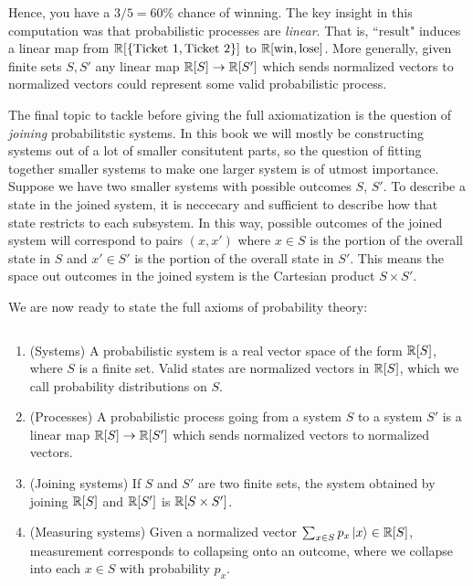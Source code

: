 Hence, you have a $3/5=60\%$ chance of winning. The key insight in this computation was that probabilistic processes are \textit{linear}. That is, ``$\text{result}$" induces a linear map from $\mathbb{R}[\{\text{Ticket 1}, \text{Ticket 2}\}]$ to $\mathbb{R}[\text{win},\text{lose}]$. More generally, given finite sets $S,S'$ any linear map $\mathbb{R}[S]\to\mathbb{R}[S']$ which sends normalized vectors to normalized vectors could represent some valid probabilistic process.

The final topic to tackle before giving the full axiomatization is the question of \textit{joining} probabilitstic systems. In this book we will mostly be constructing systems out of a lot of smaller consitutent parts, so the question of fitting together smaller systems to make one larger system is of utmost importance. Suppose we have two smaller systems with possible outcomes $S$, $S'$. To describe a state in the joined system, it is neccecary and sufficient to describe how that state restricts to each subsystem. In this way, possible outcomes of the joined system will correspond to pairs $(x,x')$ where $x\in S$ is the portion of the overall state in $S$ and $x'\in S'$ is the portion of the overall state in $S'$. This means the space out outcomes in the joined system is the Cartesian product $S\times S'$.

We are now ready to state the full axioms of probability theory:

\begin{definition} $\,$

\begin{enumerate}
\item (Systems) A probabilistic system is a real vector space of the form $\mathbb{R}[S]$, where $S$ is a finite set. Valid states are normalized vectors in $\mathbb{R}[S]$, which we call probability distributions on $S$.
\item (Processes) A probabilistic process going from a system $S$ to a system $S'$ is a linear map $\mathbb{R}[S]\to \mathbb{R}[S']$ which sends normalized vectors to normalized vectors.
\item (Joining systems) If $S$ and $S'$ are two finite sets, the system obtained by joining $\mathbb{R}[S]$ and $\mathbb{R}[S']$ is $\mathbb{R}[S\times S']$.
\item (Measuring systems) Given a normalized vector $\sum_{x\in S}p_x \left |x\right>\in \mathbb{R}[S]$, measurement corresponds to collapsing onto an outcome, where we collapse into each $x\in S$ with probability $p_x$.
\end{enumerate}

\raggedleft\qedsymbol{}
\end{definition}

